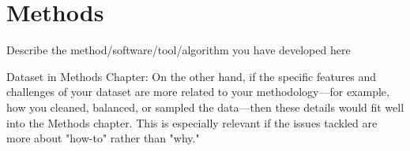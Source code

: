 \chapter{Methods}\label{chap:methods}


Describe the method/software/tool/algorithm you have developed here

Dataset in Methods Chapter: On the other hand, if the specific features and challenges of your dataset are more related to your methodology—for example, how you cleaned, balanced, or sampled the data—then these details would fit well into the Methods chapter. This is especially relevant if the issues tackled are more about "how-to" rather than "why."